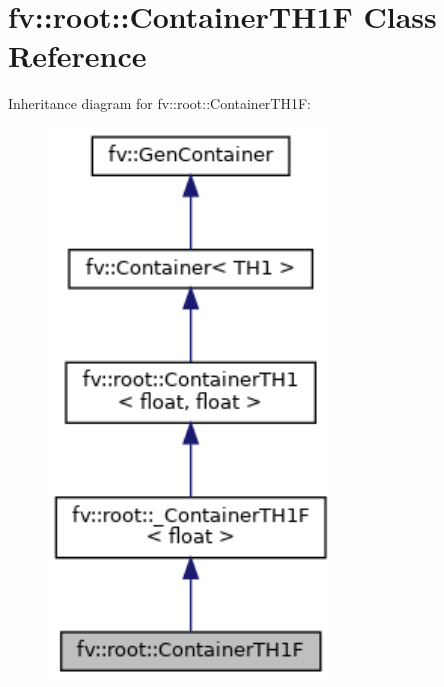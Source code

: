 \hypertarget{classfv_1_1root_1_1ContainerTH1F}{}\section{fv\+:\+:root\+:\+:Container\+T\+H1F Class Reference}
\label{classfv_1_1root_1_1ContainerTH1F}


Inheritance diagram for fv\+:\+:root\+:\+:Container\+T\+H1F\+:
\nopagebreak
\begin{figure}[H]
\begin{center}
\leavevmode
\includegraphics[width=214pt]{classfv_1_1root_1_1ContainerTH1F__inherit__graph}
\end{center}
\end{figure}


